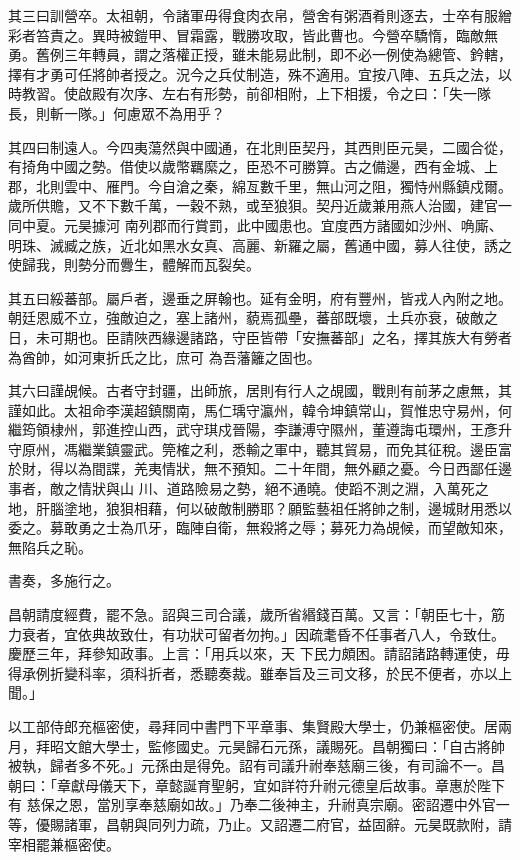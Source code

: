 \begin{pinyinscope}
 其三曰訓營卒。太祖朝，令諸軍毋得食肉衣帛，營舍有粥酒肴則逐去，士卒有服繒彩者笞責之。異時被鎧甲、冒霜露，戰勝攻取，皆此曹也。今營卒驕惰，臨敵無勇。舊例三年轉員，謂之落權正授，雖未能易此制，即不必一例使為總管、鈐轄，擇有才勇可任將帥者授之。況今之兵仗制造，殊不適用。宜按八陣、五兵之法，以
 時教習。使啟殿有次序、左右有形勢，前卻相附，上下相援，令之曰：「失一隊長，則斬一隊。」何慮眾不為用乎？



 其四曰制遠人。今四夷蕩然與中國通，在北則臣契丹，其西則臣元昊，二國合從，有掎角中國之勢。借使以歲幣羈縻之，臣恐不可勝算。古之備邊，西有金城、上郡，北則雲中、雁門。今自滄之秦，綿亙數千里，無山河之阻，獨恃州縣鎮戍爾。歲所供贍，又不下數千萬，一穀不熟，或至狼狽。契丹近歲兼用燕人治國，建官一同中夏。元昊據河
 南列郡而行賞罰，此中國患也。宜度西方諸國如沙州、唃廝、明珠、滅臧之族，近北如黑水女真、高麗、新羅之屬，舊通中國，募人往使，誘之使歸我，則勢分而釁生，體解而瓦裂矣。



 其五曰綏蕃部。屬戶者，邊垂之屏翰也。延有金明，府有豐州，皆戎人內附之地。朝廷恩威不立，強敵迫之，塞上諸州，藐焉孤壘，蕃部既壞，土兵亦衰，破敵之日，未可期也。臣請陜西緣邊諸路，守臣皆帶「安撫蕃部」之名，擇其族大有勞者為酋帥，如河東折氏之比，庶可
 為吾藩籬之固也。



 其六曰謹覘候。古者守封疆，出師旅，居則有行人之覘國，戰則有前茅之慮無，其謹如此。太祖命李漢超鎮關南，馬仁瑀守瀛州，韓令坤鎮常山，賀惟忠守易州，何繼筠領棣州，郭進控山西，武守琪戍晉陽，李謙溥守隰州，董遵誨屯環州，王彥升守原州，馮繼業鎮靈武。筦榷之利，悉輸之軍中，聽其貿易，而免其征稅。邊臣富於財，得以為間諜，羌夷情狀，無不預知。二十年間，無外顧之憂。今日西鄙任邊事者，敵之情狀與山
 川、道路險易之勢，絕不通曉。使蹈不測之淵，入萬死之地，肝腦塗地，狼狽相藉，何以破敵制勝耶？願監藝祖任將帥之制，邊城財用悉以委之。募敢勇之士為爪牙，臨陣自衛，無殺將之辱；募死力為覘候，而望敵知來，無陷兵之恥。



 書奏，多施行之。



 昌朝請度經費，罷不急。詔與三司合議，歲所省緡錢百萬。又言：「朝臣七十，筋力衰者，宜依典故致仕，有功狀可留者勿拘。」因疏耄昏不任事者八人，令致仕。慶歷三年，拜參知政事。上言：「用兵以來，天
 下民力頗困。請詔諸路轉運使，毋得承例折變科率，須科折者，悉聽奏裁。雖奉旨及三司文移，於民不便者，亦以上聞。」



 以工部侍郎充樞密使，尋拜同中書門下平章事、集賢殿大學士，仍兼樞密使。居兩月，拜昭文館大學士，監修國史。元昊歸石元孫，議賜死。昌朝獨曰：「自古將帥被執，歸者多不死。」元孫由是得免。詔有司議升祔奉慈廟三後，有司論不一。昌朝曰：「章獻母儀天下，章懿誕育聖躬，宜如詳符升祔元德皇后故事。章惠於陛下有
 慈保之恩，當別享奉慈廟如故。」乃奉二後神主，升祔真宗廟。密詔遷中外官一等，優賜諸軍，昌朝與同列力疏，乃止。又詔遷二府官，益固辭。元昊既款附，請宰相罷兼樞密使。




\end{pinyinscope}
